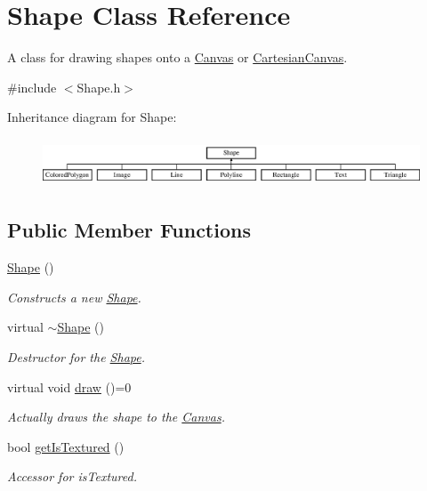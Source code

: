 \hypertarget{class_shape}{\section{Shape Class Reference}
\label{class_shape}
}


A class for drawing shapes onto a \hyperlink{class_canvas}{Canvas} or \hyperlink{class_cartesian_canvas}{Cartesian\+Canvas}.  




{\ttfamily \#include $<$Shape.\+h$>$}

Inheritance diagram for Shape\+:\begin{figure}[H]
\begin{center}
\leavevmode
\includegraphics[height=1.441442cm]{class_shape}
\end{center}
\end{figure}
\subsection*{Public Member Functions}
\begin{DoxyCompactItemize}
\item 
\hyperlink{class_shape_aaa8d87171e65e0d8ba3c5459978992a7}{Shape} ()
\begin{DoxyCompactList}\small\item\em Constructs a new \hyperlink{class_shape}{Shape}. \end{DoxyCompactList}\item 
virtual \hyperlink{class_shape_ac3b9fc48965274893f25b18aa14ba665}{$\sim$\+Shape} ()
\begin{DoxyCompactList}\small\item\em Destructor for the \hyperlink{class_shape}{Shape}. \end{DoxyCompactList}\item 
virtual void \hyperlink{class_shape_afacc5aad8e37308c3ce8fef768199b05}{draw} ()=0
\begin{DoxyCompactList}\small\item\em Actually draws the shape to the \hyperlink{class_canvas}{Canvas}. \end{DoxyCompactList}\item 
\hypertarget{class_shape_a8ccc804d7528af16e3a14017b52dbe58}{bool \hyperlink{class_shape_a8ccc804d7528af16e3a14017b52dbe58}{get\+Is\+Textured} ()}\label{class_shape_a8ccc804d7528af16e3a14017b52dbe58}

\begin{DoxyCompactList}\small\item\em Accessor for {\itshape is\+Textured}. \end{DoxyCompactList}\end{DoxyCompactItemize}
